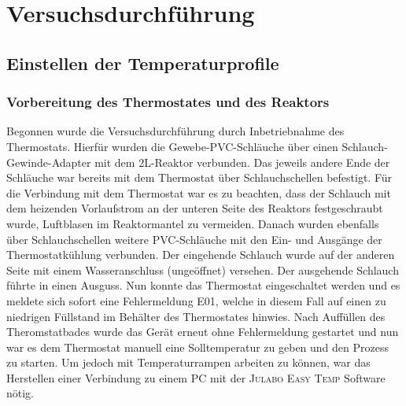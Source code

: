 \section{Versuchsdurchführung}
\label{sec:durchfuerung}

\subsection{Einstellen der Temperaturprofile}
\subsubsection*{Vorbereitung des Thermostates und des Reaktors}
Begonnen wurde die Versuchsdurchführung durch Inbetriebnahme des Thermostats. Hierfür wurden die Gewebe-PVC-Schläuche über einen Schlauch-Gewinde-Adapter mit dem 2L-Reaktor verbunden. Das jeweils andere Ende der Schläuche war bereits mit dem Thermostat über Schlauchschellen befestigt. Für die Verbindung mit dem Thermostat war es zu beachten, dass der Schlauch mit dem heizenden Vorlaufstrom an der unteren Seite des Reaktors festgeschraubt wurde, Luftblasen im Reaktormantel zu vermeiden. Danach wurden ebenfalls über Schlauchschellen weitere PVC-Schläuche mit den Ein- und Ausgänge der Thermostatkühlung verbunden. Der eingehende Schlauch wurde auf der anderen Seite mit einem Wasseranschluss (ungeöffnet) versehen. Der ausgehende Schlauch führte in einen Ausguss. Nun konnte das Thermostat eingeschaltet werden und es meldete sich sofort eine Fehlermeldung E01, welche in diesem Fall auf einen zu niedrigen Füllstand im Behälter des Thermostates hinwies. Nach Auffüllen des Theromstatbades wurde das Gerät erneut ohne Fehlermeldung gestartet und nun war es dem Thermostat manuell eine Solltemperatur zu geben und den Prozess zu starten. Um jedoch mit Temperaturrampen arbeiten zu können, war das Herstellen einer Verbindung zu einem PC mit der \textsc{Julabo Easy Temp} Software nötig.

